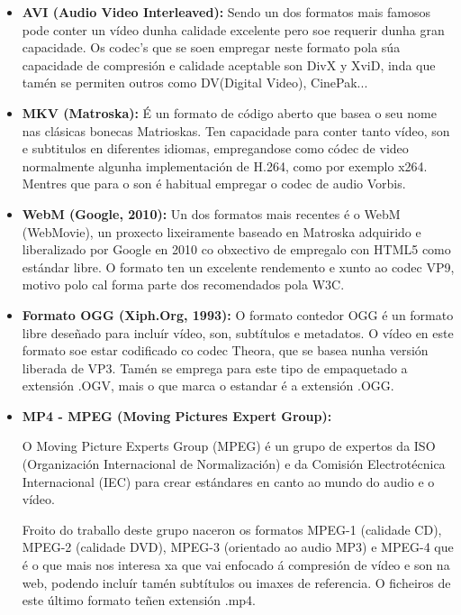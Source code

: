         \begin{itemize}
        \item \textbf{AVI (Audio Video Interleaved):} 
            Sendo un dos formatos mais famosos pode conter un vídeo dunha calidade excelente pero
            soe requerir dunha gran capacidade. Os codec's que se soen empregar neste formato pola 
            súa capacidade de compresión e calidade aceptable son DivX y XviD, inda que tamén se 
            permiten outros como DV(Digital Video), CinePak... 
            
        \item \textbf{MKV (Matroska):}
            É un formato de código aberto que basea o seu nome nas clásicas bonecas Matrioskas. Ten
            capacidade para conter tanto vídeo, son e subtitulos en diferentes idiomas, empregandose
            como códec de video normalmente algunha implementación de H.264, como por exemplo x264. 
            Mentres que para o son é habitual empregar o codec de audio Vorbis.

        \item \textbf{ WebM (Google, 2010):}
            Un dos formatos mais recentes é o WebM (WebMovie), un proxecto lixeiramente baseado en 
            Matroska adquirido e liberalizado por Google en 2010 co obxectivo de empregalo con HTML5
            como estándar libre. O formato ten un excelente rendemento e xunto ao codec VP9, motivo
            polo cal forma parte dos recomendados pola W3C.
            
        \item \textbf{Formato OGG (Xiph.Org, 1993):} 
            O formato contedor OGG é un formato libre deseñado para incluír vídeo, son, 
            subtítulos e metadatos. O vídeo en este formato soe estar codificado co codec Theora, 
            que se basea nunha versión liberada de VP3. Tamén se emprega para este tipo de 
            empaquetado a extensión .OGV, mais o que marca o estandar é a extensión .OGG.  
            
        \item \textbf{MP4 - MPEG (Moving Pictures Expert Group):}
        
        O  Moving Picture Experts Group (MPEG) é un grupo de expertos da ISO (Organización 
        Internacional de Normalización) e da Comisión Electrotécnica Internacional (IEC) para
        crear estándares en canto ao mundo do audio e o vídeo.
        
        Froito do traballo deste grupo naceron os formatos MPEG-1 (calidade CD), MPEG-2 (calidade 
        DVD), MPEG-3 (orientado ao audio MP3) e MPEG-4 que é o que mais nos interesa xa que vai 
        enfocado á compresión de vídeo e son na web, podendo incluír tamén subtítulos ou imaxes de 
        referencia. O ficheiros de este último formato teñen extensión .mp4.

        \end{itemize}


